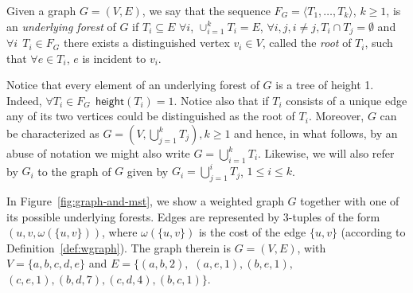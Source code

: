 \begin{definition}\label{def:u-forest}
Given a graph $G=(V,E)$, we say that the sequence $F_G = \langle T_1,\dots,T_k\rangle$, $k \ge 1$, 
is an \emph{underlying forest} of $G$ 
if $T_i \subseteq E$ $\forall i$, $\cup_{i=1}^k T_i = E$, $\forall i,j, i\neq j, T_i\cap T_j = \emptyset$
and  $\forall i\:\: T_i\in F_G$ there exists a distinguished vertex $v_i\in V$, called the \emph{root} 
of $T_i$, such that $\forall e \in T_i$,  $e$ is incident to $v_i$.
\end{definition}
 
Notice that every element of an underlying forest of $G$ is a tree of height 1. Indeed, 
$\forall T_i \in F_G\:\: \mathsf{height}(T_i)=1$. Notice also that if $T_i$ consists of a unique edge 
any of its two vertices could be distinguished as the root of $T_i$.
Moreover, $G$ can be characterized as $G=(V,\bigcup_{j=1}^k T_j), k\ge 1$ and hence, 
in what follows, by an abuse of notation we might also write  $G = \bigcup_{i=1}^k T_i$. 
Likewise, we will also refer by $G_i$ to the graph of $G$ given by $G_i = \bigcup_{j=1}^i T_j$, $1\leq i\leq k$.

 


In Figure~\ref{fig:graph-and-mst}, we show a weighted graph $G$ together with one of its possible underlying forests. 
Edges are represented by 3-tuples of the form $(u,v,\omega(\{u,v\}))$, where $\omega(\{u,v\})$ is the cost of the edge $\{u,v\}$ (according to Definition~\ref{def:wgraph}). The graph therein is 
$G=(V,E)$, with $V= \{a,b,c,d,e\}$ and 
$E= \{(a,b,2),$ $(a,e,1),(b,e,1),$ $(c,e,1),(b,d,7),(c,d,4),(b,c,1)\}$. 

